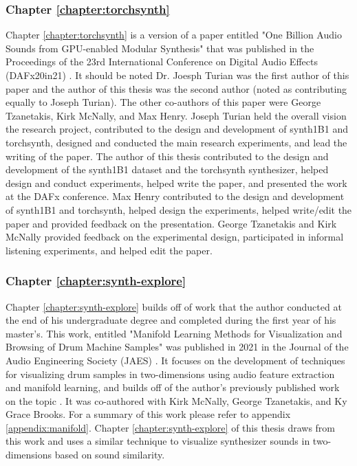 \subsubsection{Chapter \ref{chapter:torchsynth}}
Chapter \ref{chapter:torchsynth} is a version of a paper entitled "One Billion Audio Sounds from GPU-enabled Modular Synthesis" that was published in the Proceedings of the 23rd International Conference on Digital Audio Effects (DAFx20in21) \cite{turian2021one}. It should be noted Dr. Joesph Turian was the first author of this paper and the author of this thesis was the second author (noted as contributing equally to Joseph Turian). The other co-authors of this paper were George Tzanetakis, Kirk McNally, and Max Henry. Joseph Turian held the overall vision the research project, contributed to the design and development of synth1B1 and torchsynth, designed and conducted the main research experiments, and lead the writing of the paper. The author of this thesis contributed to the design and development of the synth1B1 dataset and the torchsynth synthesizer, helped design and conduct experiments, helped write the paper, and presented the work at the DAFx conference. Max Henry contributed to the design and development of synth1B1 and torchsynth, helped design the experiments, helped write/edit the paper and provided feedback on the presentation. George Tzanetakis and Kirk McNally provided feedback on the experimental design, participated in informal listening experiments, and helped edit the paper.

\subsubsection{Chapter \ref{chapter:synth-explore}}
Chapter \ref{chapter:synth-explore} builds off of work that the author conducted at the end of his undergraduate degree and completed during the first year of his master's. This work, entitled "Manifold Learning Methods for Visualization and Browsing of Drum Machine Samples" was published in 2021 in the Journal of the Audio Engineering Society (JAES) \cite{shier2021manifold}. It focuses on the development of techniques for visualizing drum samples in two-dimensions using audio feature extraction and manifold learning, and builds off of the author's previously published work on the topic \cite{shier2017analysis, shier2017sieve}. It was co-authored with Kirk McNally, George Tzanetakis, and Ky Grace Brooks. For a summary of this work please refer to appendix \ref{appendix:manifold}. Chapter \ref{chapter:synth-explore} of this thesis draws from this work and uses a similar technique to visualize synthesizer sounds in two-dimensions based on sound similarity.

